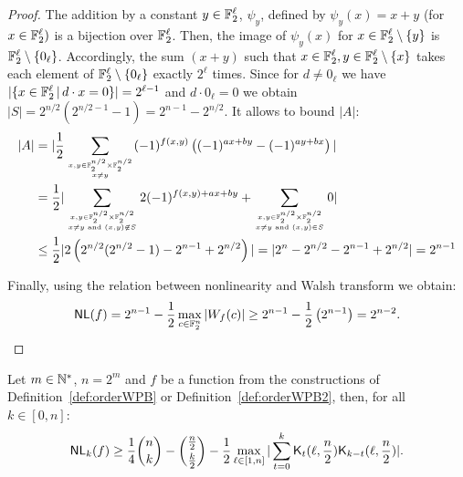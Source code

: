 \documentclass[11pt]{llncs}
\begin{document}
\begin{proof}
The addition by a constant $y\in \mathbb{F}_2^{\ell}$, $\psi_y$, defined by $\psi_y(x)=x + y$ (for $x\in \mathbb{F}_2^{\ell})$ is a bijection over $ \mathbb{F}_2^{\ell}$. Then, the image of $\psi_y(x)$ for $x\in \mathbb{F}_2^{\ell}\setminus \{y\}$ is $\mathbb{F}_2^{\ell}\setminus \{0_\ell\}$. 
Accordingly, the sum  $(x+y)$ such that $x\in \mathbb{F}_2^\ell, y \in \mathbb{F}_2^\ell\setminus \{x\} $ takes each element of $\mathbb{F}_2^\ell \setminus \{0_\ell\}$ exactly $2^\ell$ times. 
Since for $d\ne 0_\ell$ we have $|\{x \in \mathbb{F}_2^\ell \, | \, d \cdot x=0\}|=2^{\ell-1}$ and $d \cdot 0_\ell =0$ we obtain 
$|S|= 2^{n/2} (2^{n/2-1}-1)=2^{n-1}-2^{n/2}$. 
It allows to bound $|A|$:
\begin{align*}
|A|&=|\frac{1}{2} \sum_{x,y \in \mathbb{F}_2^{n/2} \times \mathbb{F}_2^{n/2} \atop {x \ne y}} (-1)^{f(x,y)} \left( (-1)^{a x+ by} - (-1)^{a y+ bx} \right)|\\
&=\frac{1}{2}| \sum_{x,y \in \mathbb{F}_2^{n/2} \times \mathbb{F}_2^{n/2} \atop {x \ne y \text{ and } (x,y)\not \in S}} 2(-1)^{f(x,y)+a x+ by} + 
\sum_{x,y \in \mathbb{F}_2^{n/2} \times \mathbb{F}_2^{n/2} \atop {x \ne y \text{ and } (x,y) \in S}} 0|\\
&\le \frac{1}{2}| 2 \left(2^{n/2}(2^{n/2}-1) - 2^{n-1}+2^{n/2}\right) |
= |2^{n} - 2^{n/2}-2^{n-1} + 2^{n/2}|
=2^{n-1}
\end{align*}

Finally, using the relation between nonlinearity and Walsh transform we obtain:
\[\mathsf{NL}(f)= 2^{n-1}-\frac{1}{2} \max_{c \in \mathbb{F}_2^n}|W_{f}(c)|\ge 2^{n-1}-\frac{1}{2} \left(2^{n-1}\right)=2^{n-2}.\]



\end{proof}



\begin{theorem}\label{th:NLkbound}
	Let $m\in \mathbb{N}^*$, $n=2^m$ and $f$ be a function from the constructions of Definition~\ref{def:orderWPB} or Definition~\ref{def:orderWPB2}, then, for all $k\in [0,n]$:
	\[\mathsf{NL}_{k}(f) \ge \frac{1}{4} \binom{n}{k} - \binom{\frac{n}{2}}{\frac{k}{2}} - \frac{1}{2}   \max_{\ell \in [1,n]} |\sum_{t=0}^{k} \mathsf{K}_{t}(\ell,\frac{n}{2}) \mathsf{K}_{k-t}(\ell,\frac{n}{2}) |.\]
\end{theorem}
\end{document}
